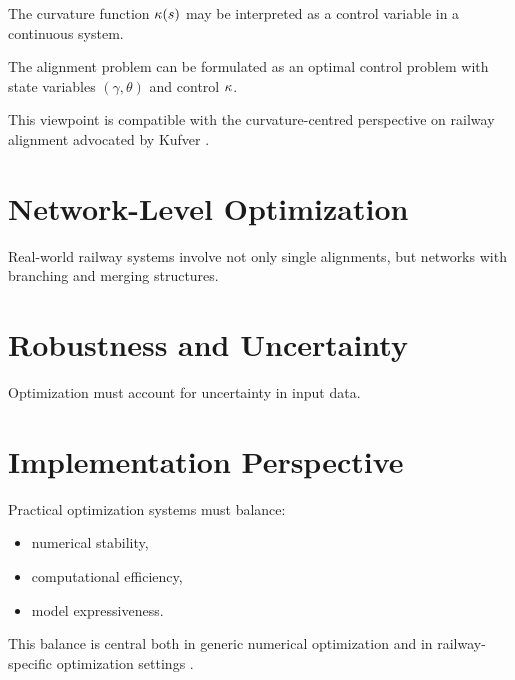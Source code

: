 The curvature function $\kappa(s)$ may be interpreted as a control
variable in a continuous system.

\begin{definition}
The alignment problem can be formulated as an optimal control problem
with state variables $(\gamma,\theta)$ and control $\kappa$.
\end{definition}

This viewpoint is compatible with the curvature-centred perspective on
railway alignment advocated by Kufver
\cite{Kufver1997MathematicalDescription,Kufver2000RailwayAlignment}.


\section{Network-Level Optimization}

Real-world railway systems involve not only single alignments, but
networks with branching and merging structures.



\section{Robustness and Uncertainty}

Optimization must account for uncertainty in input data.



\section{Implementation Perspective}

Practical optimization systems must balance:
\begin{itemize}
\item numerical stability,
\item computational efficiency,
\item model expressiveness.
\end{itemize}

This balance is central both in generic numerical optimization
\cite{Nocedal2006NumericalOptimization}
and in railway-specific optimization settings
\cite{Kufver2000RailwayAlignment}.

